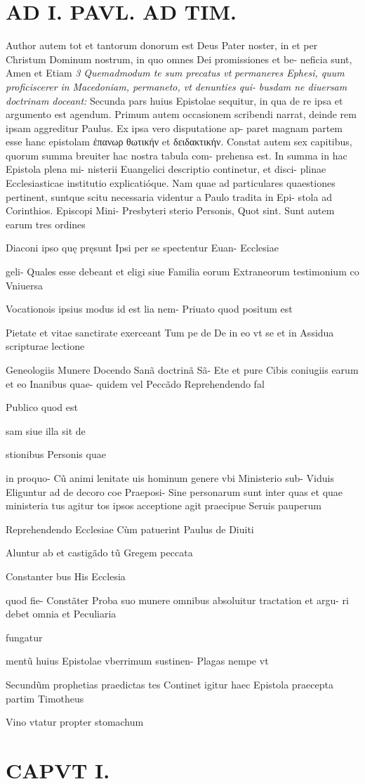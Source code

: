 \documentclass{article}
\begin{document}
\begin{pages}
\section*{AD I. PAVL. AD TIM. }Author autem tot et tantorum donorum est Deus Pater noster, in et per Christum Dominum nostrum, in quo omnes Dei promissiones et be- neficia sunt, Amen et Etiam \textit{3} \textit{Quemadmodum te sum precatus vt} \textit{permaneres Ephesi, quum proficiscerer in} \textit{Macedoniam, permaneto, vt denunties qui-} \textit{busdam ne diuersam doctrinam doceant:} Secunda pars huius Epistolae sequitur, in qua de re ipsa et argumento est agendum. Primum autem occasionem scribendi narrat, deinde rem ipsam aggreditur Paulus. Ex ipsa vero disputatione ap- paret magnam partem esse hanc epistolam ἐπανωρ θωτικήν et δειδακτικήν. Constat autem sex capitibus, quorum summa breuiter hac nostra tabula com- prehensa est. In summa in hac Epistola plena mi- nisterii Euangelici descriptio continetur, et disci- plinae Ecclesiasticae institutio explicatióque. Nam quae ad particulares quaestiones pertinent, suntque scitu necessaria videntur a Paulo tradita in Epi- stola ad Corinthios. 
\marginpar{[ p.7 ]}Episcopi Mini- Presbyteri sterio Personis, Quot sint. Sunt autem earum tres ordines { Diaconi ipso quę pręsunt Ipsi per se spectentur Euan- Ecclesiae { geli- Quales esse debeant et eligi siue Familia eorum Extraneorum testimonium co Vniuersa { Vocationois ipsius modus id est lia nem- Priuato quod positum est { Pietate et vitae sanctirate exerceant Tum pe de De in eo vt se et in Assidua scripturae lectione { Geneologiis Munere Docendo Sanã doctrinã Sã- Ete et pure Cibis coniugiis earum et eo Inanibus quae- quidem vel Peccãdo Reprehendendo fal { Publico quod est { sam siue illa sit de { stionibus Personis quae { in proquo- Cũ animi lenitate uis hominum genere vbi Ministerio sub- Viduis Eliguntur ad de decoro coe Praeposi- Sine personarum sunt inter quas et quae ministeria tus agitur tos ipsos acceptione agit praecipue Seruis pauperum { { Reprehendendo Ecclesiae Cùm patuerint Paulus de Diuiti { Aluntur ab et castigãdo tũ Gregem peccata { Constanter bus His Ecclesia { quod fie- Constãter Proba suo munere omnibus absoluitur tractation et argu- ri debet omnia et Peculiaria { fungatur { mentũ huius Epistolae vberrimum sustinen- Plagas nempe vt { Secundũm prophetias praedictas tes Continet igitur haec Epistola praecepta partim Timotheus { Vino vtatur propter stomachum { 
\section*{CAPVT I. }
\marginpar{[ p.8 ]}
}}}}}}}}}}}}}}}}}}}
\end{pages}
\end{document}
